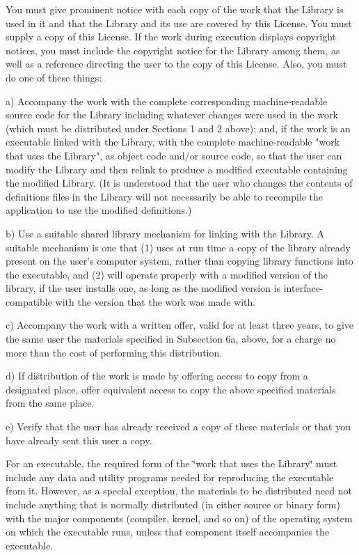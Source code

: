 You must give prominent notice with each copy of the work that the Library is used in it and that the Library and its use are covered by this License. You must supply a copy of this License. If the work during execution displays copyright notices, you must include the copyright notice for the Library among them, as well as a reference directing the user to the copy of this License. Also, you must do one of these things\+: \begin{DoxyVerb}a) Accompany the work with the complete corresponding
machine-readable source code for the Library including whatever
changes were used in the work (which must be distributed under
Sections 1 and 2 above); and, if the work is an executable linked
with the Library, with the complete machine-readable "work that
uses the Library", as object code and/or source code, so that the
user can modify the Library and then relink to produce a modified
executable containing the modified Library.  (It is understood
that the user who changes the contents of definitions files in the
Library will not necessarily be able to recompile the application
to use the modified definitions.)

b) Use a suitable shared library mechanism for linking with the
Library.  A suitable mechanism is one that (1) uses at run time a
copy of the library already present on the user's computer system,
rather than copying library functions into the executable, and (2)
will operate properly with a modified version of the library, if
the user installs one, as long as the modified version is
interface-compatible with the version that the work was made with.

c) Accompany the work with a written offer, valid for at
least three years, to give the same user the materials
specified in Subsection 6a, above, for a charge no more
than the cost of performing this distribution.

d) If distribution of the work is made by offering access to copy
from a designated place, offer equivalent access to copy the above
specified materials from the same place.

e) Verify that the user has already received a copy of these
materials or that you have already sent this user a copy.
\end{DoxyVerb}


For an executable, the required form of the \char`\"{}work that uses the
\+Library\char`\"{} must include any data and utility programs needed for reproducing the executable from it. However, as a special exception, the materials to be distributed need not include anything that is normally distributed (in either source or binary form) with the major components (compiler, kernel, and so on) of the operating system on which the executable runs, unless that component itself accompanies the executable.

